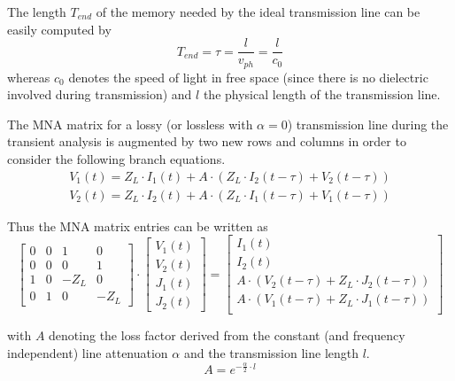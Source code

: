\addvspace{12pt}

The length $T_{end}$ of the memory needed by the ideal transmission
line can be easily computed by
\begin{equation}
T_{end} = \tau = \dfrac{l}{v_{ph}} = \dfrac{l}{c_0}
\end{equation}
whereas $c_0$ denotes the speed of light in free space (since there is
no dielectric involved during transmission) and $l$ the physical
length of the transmission line.

\addvspace{12pt}

The MNA matrix for a lossy (or lossless with $\alpha = 0$)
transmission line during the transient analysis is augmented by two
new rows and columns in order to consider the following branch
equations.
\begin{align}
\label{eq:itran_v1}
V_1\left(t\right) = Z_L\cdot I_1\left(t\right) + A\cdot\left( Z_L\cdot I_2\left(t -\tau\right) + V_2\left(t -\tau\right)\right)\\
\label{eq:itran_v2}
V_2\left(t\right) = Z_L\cdot I_2\left(t\right) + A\cdot\left( Z_L\cdot I_1\left(t -\tau\right) + V_1\left(t -\tau\right)\right)
\end{align}

Thus the MNA matrix entries can be written as
\begin{equation}
\begin{bmatrix}
0 & 0 & 1 & 0\\
0 & 0 & 0 & 1\\
1 & 0 & -Z_L & 0\\
0 & 1 & 0 & -Z_L
\end{bmatrix}
\cdot
\begin{bmatrix}
V_1\left(t\right)\\
V_2\left(t\right)\\
J_1\left(t\right)\\
J_2\left(t\right)
\end{bmatrix}
=
\begin{bmatrix}
I_1\left(t\right)\\
I_2\left(t\right)\\
A\cdot\left(V_2\left(t -\tau\right) + Z_L\cdot J_2\left(t -\tau\right)\right)\\
A\cdot\left(V_1\left(t -\tau\right) + Z_L\cdot J_1\left(t -\tau\right)\right)\\
\end{bmatrix}
\end{equation}

with $A$ denoting the loss factor derived from the constant (and
frequency independent) line attenuation $\alpha$ and the transmission
line length $l$.
\begin{equation}
A = e^{-\tfrac{\alpha}{2}\cdot l}
\end{equation}

